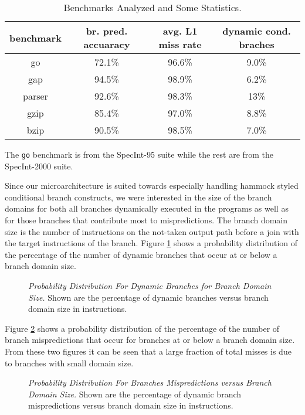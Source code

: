 \documentclass[10pt,dvips]{article}
\begin{document}
\begin{table}
\begin{center}
\caption{Benchmarks Analyzed and Some Statistics.}\label{tab:benches}
\begin{tabular}{|c|c|c|c|}
\hline 
benchmark&
br. pred. accuaracy&
avg. L1 miss rate&
dynamic cond. braches\\
\hline
\hline 
go&
72.1\%&
96.6\%&
9.0\%\\
\hline 
gap&
94.5\%&
98.9\%&
6.2\%\\
\hline 
parser&
92.6\%&
98.3\%&
13\%\\
\hline 
gzip&
85.4\%&
97.0\%&
8.8\%\\
\hline 
bzip&
90.5\%&
98.5\%&
7.0\%\\
\hline
\end{tabular}
\end{center}
\end{table}

The 
{\tt go} benchmark is from the SpecInt-95 suite while the rest
are from the SpecInt-2000 suite.

Since our microarchitecture is suited towards especially handling
hammock styled conditional branch constructs, we were interested
in the size of the branch domains for both all branches
dynamically executed in the programs as well as for those branches 
that contribute most to mispredictions.  The branch domain size
is the number of instructions on the not-taken output path
before a join with the target instructions of the branch.
Figure \ref{fig:numbranches} shows a probability distribution of
the percentage of the number of dynamic branches that occur at
or below a branch domain size.  

\begin{figure}
\centering
{}
\caption{{\em Probability Distribution For Dynamic Branches for 
Branch Domain Size.} 
Shown are the percentage of dynamic branches versus branch domain size
in instructions.}
\label{fig:numbranches}
\end{figure}

Figure \ref{fig:mispredictions} shows a probability distribution of
the percentage of the number of branch mispredictions that
occur for branches at or below a branch domain size.
From these two figures it can be seen 
that a large fraction of total misses is due to branches with small domain
size. 

\begin{figure}
\centering
{}
\caption{{\em Probability Distribution For Branches Mispredictions
versus
Branch Domain Size.} 
Shown are the percentage of dynamic branch mispredictions versus 
branch domain size
in instructions.}
\label{fig:mispredictions}
\end{figure}
\end{document}

